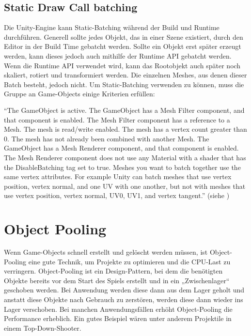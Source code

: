\subsection{Static Draw Call batching}
Die Unity-Engine kann Static-Batching während der Build und Runtime durchführen. Generell sollte jedes Objekt, das in einer Szene existiert, durch den Editor in der Build Time gebatcht werden. Sollte ein Objekt erst später erzeugt werden, kann dieses jedoch auch mithilfe der Runtime API gebatcht werden. Wenn die Runtime API verwendet wird, kann das Rootobjekt auch später noch skaliert, rotiert und transformiert werden. Die einzelnen Meshes, aus denen dieser Batch besteht, jedoch nicht. Um Static-Batching verwenden zu können, muss die Gruppe an Game-Objects einige Kriterien erfüllen:
\cite{_drawcallbatching}

"`The GameObject is active.
The GameObject has a Mesh Filter
component, and that component is enabled.
The Mesh Filter component has a reference to a Mesh.
The mesh is read/write enabled.
The mesh has a vertex count greater than 0.
The mesh has not already been combined with another Mesh.
The GameObject has a Mesh Renderer
component, and that component is enabled.
The Mesh Renderer component does not use any Material with a shader
that has the DisableBatching tag set to true.
Meshes you want to batch together use the same vertex attributes. For example Unity can batch meshes that use vertex position, vertex normal, and one UV with one another, but not with meshes that use vertex position, vertex normal, UV0, UV1, and vertex tangent."'
(siehe \cite{_drawcallbatching})


\section{Object Pooling}
Wenn Game-Objects schnell erstellt und gelöscht werden müssen, ist Object-Pooling eine gute Technik, um Projekte zu optimieren und die CPU-Last zu verringern. Object-Pooling ist ein Design-Pattern, bei dem die benötigten Objekte bereits vor dem Start des Spiels erstellt und in ein „Zwischenlager“ geschoben werden. Bei Anwendung werden diese dann aus dem Lager geholt und anstatt diese Objekte nach Gebrauch zu zerstören, werden diese dann wieder ins Lager verschoben. Bei manchen Anwendungsfällen erhöht Object-Pooling die Performance erheblich. Ein gutes Beispiel wären unter anderem Projektile in einem Top-Down-Shooter.
\cite{_objectpooling}

